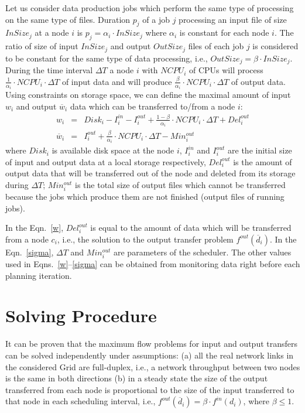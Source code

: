 \documentclass{svjour3}                     %
\begin{document}
Let us consider data production jobs which perform the same type of processing
on the same type of files. Duration $p_{j}$ of a job $j$  processing an input
file of size $InSize_{j}$ at a node $i$ is $p_{j} = \alpha_{i} \cdot
InSize_{j}$ where $\alpha_{i}$ is constant for each node $i$.  The ratio of
size of input $InSize_{j}$ and output $OutSize_{j}$ files of each job $j$ is
considered to be constant for the same type of data processing, i.e.,
$OutSize_{j} = \beta \cdot InSize_{j}$.  During the time interval $\Delta T$ a
node $i$ with $NCPU_{i}$  of CPUs  will process $\frac{1}{\alpha_{i}} \cdot
NCPU_{i} \cdot \Delta T$ of input data and will produce
$\frac{\beta}{\alpha_{i}} \cdot NCPU_{i} \cdot \Delta T$ of output data.
Using constraints on storage space, we can define the maximal amount of input
$w_{i}$ and output $\overline{w}_{i}$ data which can be transferred to/from a
node $i$:
%
\begin{eqnarray}
w_{i} &=&
Disk_{i} - I_{i}^{in} - I_{i}^{out} + \frac{1 - \beta}{\alpha_{i}} \cdot
NCPU_{i} \cdot \Delta T + Del_{i}^{out} \label{w}\\
\overline{w}_{i} &=& I_{i}^{out} + \frac{\beta}{\alpha_{i}} \cdot NCPU_{i} \cdot \Delta T - Min_{i}^{out} \label{sigma}
\end{eqnarray}  
%
where $Disk_{i}$ is available disk space at the node $i$, $I_{i}^{in}$ and
$I_{i}^{out}$ are the initial size of input and output data at a local storage
respectively, $Del_{i}^{out}$ is the amount of output data that will be
transferred out of the node and deleted from its storage during $\Delta T$;
$Min_{i}^{out}$ is the total size of output files which cannot be transferred
because the jobs which produce them are not finished (output files of running
jobs). 

In the Eqn.~\ref{w}, $Del_{i}^{out}$ is equal to the amount of data which will
be transferred from a node $c_{i}$, i.e., the solution to the output transfer
problem $f^{out}(\overline{d}_{i})$. In the Eqn.~\ref{sigma}, $\Delta T$ and
$Min_{i}^{out}$ are parameters of the scheduler. The other values used in
Eqns.~\ref{w}--\ref{sigma} can be obtained from monitoring data right before
each planning iteration.

\section{Solving Procedure}
\label{solve}

It can be proven that the maximum flow problems for input and output transfers
can be solved independently under assumptions: (a) all the real network links
in the considered Grid are full-duplex, i.e., a network throughput between two
nodes is the same in both directions (b) in a steady state the size of the
output transferred from each node is proportional to the size of the input
transferred to that node in each scheduling interval, i.e.,
$f^{out}(\overline{d}_{i})= \beta \cdot f^{in}(d_{i})$, where $\beta \leq 1$.
\end{document}
